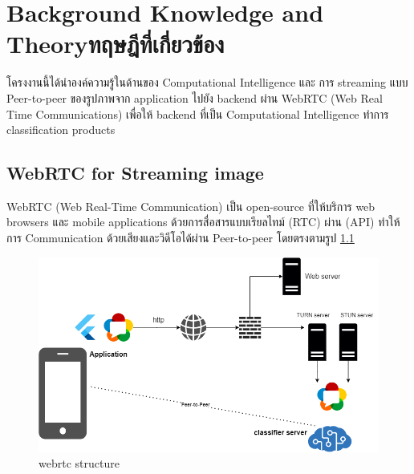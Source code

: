 \chapter{\ifenglish Background Knowledge and Theory\else ทฤษฎีที่เกี่ยวข้อง\fi}

\par โครงงานนี้ได้นำองค์ความรู้ในด้านของ Computational Intelligence และ การ streaming แบบ Peer-to-peer   
ของรูปภาพจาก application ไปยัง backend ผ่าน WebRTC (Web Real Time Communications) เพื่อให้ backend 
ที่เป็น Computational Intelligence ทำการ classification products  
  
  
\section{WebRTC for Streaming image}
\par WebRTC (Web Real-Time Communication) เป็น open-source  ที่ให้บริการ  web browsers
 และ mobile applications ด้วยการสื่อสารแบบเรียลไทม์ (RTC) ผ่าน (API)  
 ทำให้การ Communication ด้วยเสียงและวิดีโอได้ผ่าน  Peer-to-peer   โดยตรงตามรูป \ref{fig:webrtc structure}
 
 
\begin{figure}[h]
\begin{center}
\includegraphics[scale=0.5]{pic/webrtc.png}
\end{center}

\caption[webrtc structure]{webrtc structure}
\label{fig:webrtc structure}
\end{figure}



